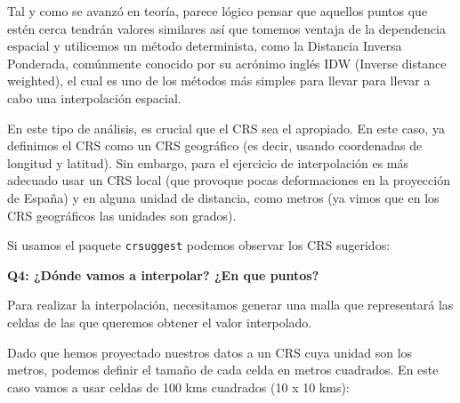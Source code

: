 \documentclass[
]{book}
\newenvironment{Shaded}{\begin{snugshade}}{\end{snugshade}}
\newcommand{\AttributeTok}[1]{\textcolor[rgb]{0.77,0.63,0.00}{#1}}
\newcommand{\CommentTok}[1]{\textcolor[rgb]{0.56,0.35,0.01}{\textit{#1}}}
\newcommand{\DecValTok}[1]{\textcolor[rgb]{0.00,0.00,0.81}{#1}}
\newcommand{\FunctionTok}[1]{\textcolor[rgb]{0.00,0.00,0.00}{#1}}
\newcommand{\NormalTok}[1]{#1}
\newcommand{\OtherTok}[1]{\textcolor[rgb]{0.56,0.35,0.01}{#1}}
\newcommand{\SpecialCharTok}[1]{\textcolor[rgb]{0.00,0.00,0.00}{#1}}
\newcommand{\StringTok}[1]{\textcolor[rgb]{0.31,0.60,0.02}{#1}}
\begin{document}
Tal y como se avanzó en teoría, parece lógico pensar que aquellos puntos que
estén cerca tendrán valores similares así que tomemos ventaja de la dependencia
espacial y utilicemos un método determinista, como la Distancia Inversa
Ponderada, comúnmente conocido por su acrónimo inglés IDW (Inverse distance
weighted), el cual es uno de los métodos más simples para llevar para llevar a
cabo una interpolación espacial.

En este tipo de análisis, es crucial que el CRS sea el apropiado. En este caso,
ya definimos el CRS como un CRS geográfico (es decir, usando coordenadas de
longitud y latitud). Sin embargo, para el ejercicio de interpolación es más
adecuado usar un CRS local (que provoque pocas deformaciones en la proyección de
España) y en alguna unidad de distancia, como metros (ya vimos que en los CRS
geográficos las unidades son grados).

Si usamos el paquete \texttt{crsuggest} podemos observar los CRS sugeridos:

\begin{Shaded}
\end{Shaded}

\textbf{Q4: ¿Dónde vamos a interpolar? ¿En que puntos?}

Para realizar la interpolación, necesitamos generar una malla que representará
las celdas de las que queremos obtener el valor interpolado.

Dado que hemos proyectado nuestros datos a un CRS cuya unidad son los metros,
podemos definir el tamaño de cada celda en metros cuadrados. En este caso vamos
a usar celdas de 100 kms cuadrados (10 x 10 kms):
\end{document}
